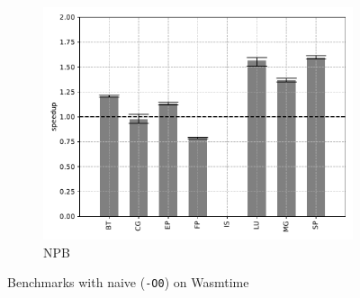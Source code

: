\begin{figure}
\begin{subfigure}[t]{.45\textwidth}
        \includegraphics[width=\textwidth]
        {Images/6.1.RQ1/npb-wasmtime-naive.pdf}
        \caption{NPB}
    \end{subfigure}
    \caption{Benchmarks with naive (\texttt{-O0}) on Wasmtime}
    \label{fig:rq1-wasmtime-naive}
\end{figure}

